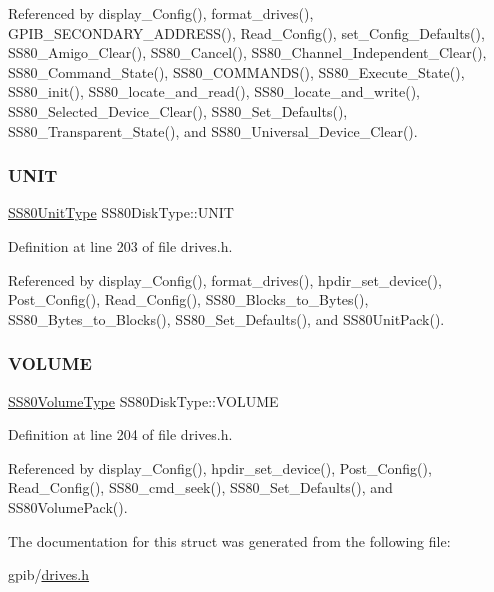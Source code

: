 Referenced by display\+\_\+\+Config(), format\+\_\+drives(), G\+P\+I\+B\+\_\+\+S\+E\+C\+O\+N\+D\+A\+R\+Y\+\_\+\+A\+D\+D\+R\+E\+S\+S(), Read\+\_\+\+Config(), set\+\_\+\+Config\+\_\+\+Defaults(), S\+S80\+\_\+\+Amigo\+\_\+\+Clear(), S\+S80\+\_\+\+Cancel(), S\+S80\+\_\+\+Channel\+\_\+\+Independent\+\_\+\+Clear(), S\+S80\+\_\+\+Command\+\_\+\+State(), S\+S80\+\_\+\+C\+O\+M\+M\+A\+N\+D\+S(), S\+S80\+\_\+\+Execute\+\_\+\+State(), S\+S80\+\_\+init(), S\+S80\+\_\+locate\+\_\+and\+\_\+read(), S\+S80\+\_\+locate\+\_\+and\+\_\+write(), S\+S80\+\_\+\+Selected\+\_\+\+Device\+\_\+\+Clear(), S\+S80\+\_\+\+Set\+\_\+\+Defaults(), S\+S80\+\_\+\+Transparent\+\_\+\+State(), and S\+S80\+\_\+\+Universal\+\_\+\+Device\+\_\+\+Clear().

\mbox{\label{structSS80DiskType_ac630da1440afd60d726c7c41eb7b990c}} 
\subsubsection{\texorpdfstring{U\+N\+IT}{UNIT}}
{\footnotesize\ttfamily \hyperlink{structSS80UnitType}{S\+S80\+Unit\+Type} S\+S80\+Disk\+Type\+::\+U\+N\+IT}



Definition at line 203 of file drives.\+h.



Referenced by display\+\_\+\+Config(), format\+\_\+drives(), hpdir\+\_\+set\+\_\+device(), Post\+\_\+\+Config(), Read\+\_\+\+Config(), S\+S80\+\_\+\+Blocks\+\_\+to\+\_\+\+Bytes(), S\+S80\+\_\+\+Bytes\+\_\+to\+\_\+\+Blocks(), S\+S80\+\_\+\+Set\+\_\+\+Defaults(), and S\+S80\+Unit\+Pack().

\mbox{\label{structSS80DiskType_adef69576dbc48a5d70ff628578d77b60}} 
\subsubsection{\texorpdfstring{V\+O\+L\+U\+ME}{VOLUME}}
{\footnotesize\ttfamily \hyperlink{structSS80VolumeType}{S\+S80\+Volume\+Type} S\+S80\+Disk\+Type\+::\+V\+O\+L\+U\+ME}



Definition at line 204 of file drives.\+h.



Referenced by display\+\_\+\+Config(), hpdir\+\_\+set\+\_\+device(), Post\+\_\+\+Config(), Read\+\_\+\+Config(), S\+S80\+\_\+cmd\+\_\+seek(), S\+S80\+\_\+\+Set\+\_\+\+Defaults(), and S\+S80\+Volume\+Pack().



The documentation for this struct was generated from the following file\+:\begin{DoxyCompactItemize}
\item 
gpib/\hyperlink{drives_8h}{drives.\+h}\end{DoxyCompactItemize}
